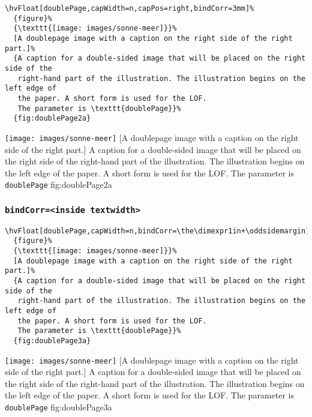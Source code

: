 \documentclass[twoside]{scrartcl}
\makeatletter
\let\hvBlindtext\Blindtext
\def\Blindtext{\par\color{black!40}\hvBlindtext\par\normalcolor}
\def\hvblindtext{\textcolor{black!40}{\blindtext@text}}
\makeatother
\begin{document}
\begin{lstlisting}
\hvFloat[doublePage,capWidth=n,capPos=right,bindCorr=3mm]%
  {figure}%
  {\texttt{[image: images/sonne-meer]}}%
  [A doublepage image with a caption on the right side of the right part.]%
  {A caption for a double-sided image that will be placed on the right side of the
   right-hand part of the illustration. The illustration begins on the left edge of 
   the paper. A short form is used for the LOF. 
   The parameter is \texttt{doublePage}}%
  {fig:doublePage2a}
\end{lstlisting}

%
  {\texttt{[image: images/sonne-meer]}}%
  [A doublepage image with a caption on the right side of the right part.]%
  {A caption for a double-sided image that will be placed on the right side of the
   right-hand part of the illustration. The illustration begins on the left edge of 
   the paper. A short form is used for the LOF. 
   The parameter is \texttt{doublePage}}%
  {fig:doublePage2a}


\Blindtext

\Blindtext

\Blindtext

\hvblindtext

\subsubsection{\texttt{bindCorr=<inside textwidth>}}

\begin{lstlisting}
\hvFloat[doublePage,capWidth=n,bindCorr=\the\dimexpr1in+\oddsidemargin]%
  {figure}%
  {\texttt{[image: images/sonne-meer]}}%
  [A doublepage image with a caption on the right side of the right part.]%
  {A caption for a double-sided image that will be placed on the right side of the
   right-hand part of the illustration. The illustration begins on the left edge of 
   the paper. A short form is used for the LOF. 
   The parameter is \texttt{doublePage}}%
  {fig:doublePage3a}
\end{lstlisting}

%
  {\texttt{[image: images/sonne-meer]}}%
  [A doublepage image with a caption on the right side of the right part.]%
  {A caption for a double-sided image that will be placed on the right side of the
   right-hand part of the illustration. The illustration begins on the left edge of 
   the paper. A short form is used for the LOF. 
   The parameter is \texttt{doublePage}}%
  {fig:doublePage3a}
\end{document}
